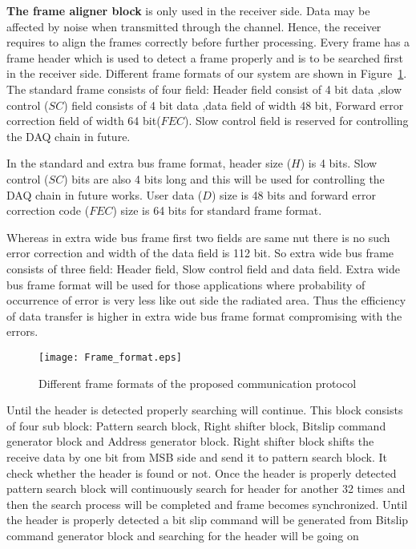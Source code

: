 \documentclass[10pt, conference, compsocconf]{IEEEtran}
\begin{document}
\iffalse

\par \textbf{The frame aligner block} is only used in the receiver side. Data may be affected by noise when transmitted through the channel. Hence, the receiver requires to align the frames correctly before further processing. Every frame has a frame header which is used to detect a frame properly and is to be searched first in the receiver side. Different frame formats of our system are shown in Figure~\ref{fig:frameformat}. The standard frame consists of four field: Header field consist of 4 bit data ,slow control ($SC$) field consists of 4 bit data ,data field of width 48 bit, Forward error correction field of width 64 bit($FEC$). 
Slow control field is reserved for controlling the DAQ chain in future.

In  the standard and extra bus frame format, header size ($H$) is 4 bits. Slow control ($SC$) bits are also 4 bits long and this will be used for controlling the DAQ chain in future works. User data ($D$) size is 48 bits and forward error correction code ($FEC$) size is 64 bits for standard frame format.

  Whereas in extra wide bus frame first two fields are same nut there is no such error correction and width of the data field is 112 bit. So extra wide bus frame consists of three field: Header field, Slow control field and data field.  Extra wide bus frame format will be used for those applications where probability of occurrence of error is very less like out side the radiated area. Thus the efficiency of data transfer is higher in extra wide bus frame format compromising with the errors.
\begin{figure}[h]
\centering
\texttt{[image: Frame\_format.eps]}
\caption{Different frame formats of the proposed communication protocol}
\vspace*{-8pt}
\label{fig:frameformat}
\end{figure}
Until the header is detected properly searching will continue. This block consists of four sub block: Pattern search block, Right shifter block, Bitslip command generator block and Address generator block. Right shifter block shifts the receive data by one bit from MSB side and send it to pattern search block. It check whether the header is found or not. Once the header is properly detected pattern search block will continuously search for header for another 32 times and then the search process will be completed and frame becomes synchronized. Until the header is properly detected a bit slip command will be generated from Bitslip command generator block and searching for the header will be going on
\end{document}
